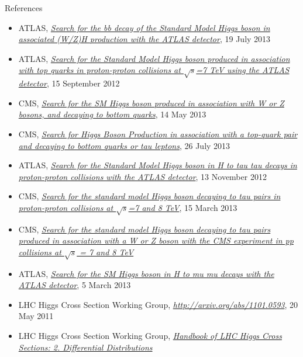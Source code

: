 \documentclass{beamer}
\begin{document}
\begin{frame}{References}
	\begin{itemize} \scriptsize
		\item ATLAS, \href{https://atlas.web.cern.ch/Atlas/GROUPS/PHYSICS/CONFNOTES/ATLAS-CONF-2013-079/}{ \textit{Search for the bb decay of the Standard Model Higgs boson in associated (W/Z)H production with the ATLAS detector}}, 19 July 2013
		\item ATLAS, \href{https://atlas.web.cern.ch/Atlas/GROUPS/PHYSICS/CONFNOTES/ATLAS-CONF-2012-135/}{\textit{Search for the Standard Model Higgs boson produced in association with top quarks in proton-proton collisions at $\sqrt s$=7 TeV using the ATLAS detector}}, 15 September 2012
		\item CMS, \href{http://cds.cern.ch/record/1546801?ln=en}{\textit{Search for the SM Higgs boson produced in association with W or Z bosons, and decaying to bottom quarks}}, 14 May 2013
		\item CMS, \href{http://cds.cern.ch/record/1564682?ln=en}{\textit{Search for Higgs Boson Production in association with a top-quark pair and decaying to bottom quarks or tau leptons}}, 26 July 2013
		\item ATLAS, \href{https://atlas.web.cern.ch/Atlas/GROUPS/PHYSICS/CONFNOTES/ATLAS-CONF-2012-160/}{\textit{Search for the Standard Model Higgs boson in H to tau tau decays in proton-proton collisions with the ATLAS detector}}, 13 November 2012
		\item CMS, \href{https://cds.cern.ch/record/1528271?ln=en}{\textit{Search for the standard model Higgs boson decaying to tau pairs in proton-proton collisions at $\sqrt s$=7 and 8 TeV}}, 15 March 2013
		\item CMS, \href{https://cds.cern.ch/record/1528147/files/HIG-12-053-pas.pdf}{\textit{Search for the standard model Higgs boson decaying to tau pairs produced in association with a W or Z boson with the CMS experiment in pp collisions at $\sqrt s$ = 7 and 8 TeV}}
		\item ATLAS, \href{https://atlas.web.cern.ch/Atlas/GROUPS/PHYSICS/CONFNOTES/ATLAS-CONF-2013-010/}{\textit{Search for the SM Higgs boson in H to mu mu decays with the ATLAS detector}}, 5 March 2013
		\item LHC Higgs Cross Section Working Group, \href{Handbook of LHC Higgs Cross Sections: 1. Inclusive Observables}{\textit{http://arxiv.org/abs/1101.0593}}, 20 May 2011
		\item LHC Higgs Cross Section Working Group, \href{http://arxiv.org/abs/1201.3084}{\textit{Handbook of LHC Higgs Cross Sections: 2. Differential Distributions}}
	\end{itemize}
\end{frame}
\end{document}
